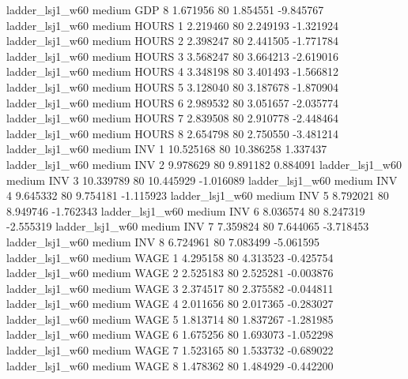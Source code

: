     ladder_lsj1_w60     medium      GDP                 8  1.671956 80       1.854551          -9.845767
    ladder_lsj1_w60     medium    HOURS                 1  2.219460 80       2.249193          -1.321924
    ladder_lsj1_w60     medium    HOURS                 2  2.398247 80       2.441505          -1.771784
    ladder_lsj1_w60     medium    HOURS                 3  3.568247 80       3.664213          -2.619016
    ladder_lsj1_w60     medium    HOURS                 4  3.348198 80       3.401493          -1.566812
    ladder_lsj1_w60     medium    HOURS                 5  3.128040 80       3.187678          -1.870904
    ladder_lsj1_w60     medium    HOURS                 6  2.989532 80       3.051657          -2.035774
    ladder_lsj1_w60     medium    HOURS                 7  2.839508 80       2.910778          -2.448464
    ladder_lsj1_w60     medium    HOURS                 8  2.654798 80       2.750550          -3.481214
    ladder_lsj1_w60     medium      INV                 1 10.525168 80      10.386258           1.337437
    ladder_lsj1_w60     medium      INV                 2  9.978629 80       9.891182           0.884091
    ladder_lsj1_w60     medium      INV                 3 10.339789 80      10.445929          -1.016089
    ladder_lsj1_w60     medium      INV                 4  9.645332 80       9.754181          -1.115923
    ladder_lsj1_w60     medium      INV                 5  8.792021 80       8.949746          -1.762343
    ladder_lsj1_w60     medium      INV                 6  8.036574 80       8.247319          -2.555319
    ladder_lsj1_w60     medium      INV                 7  7.359824 80       7.644065          -3.718453
    ladder_lsj1_w60     medium      INV                 8  6.724961 80       7.083499          -5.061595
    ladder_lsj1_w60     medium     WAGE                 1  4.295158 80       4.313523          -0.425754
    ladder_lsj1_w60     medium     WAGE                 2  2.525183 80       2.525281          -0.003876
    ladder_lsj1_w60     medium     WAGE                 3  2.374517 80       2.375582          -0.044811
    ladder_lsj1_w60     medium     WAGE                 4  2.011656 80       2.017365          -0.283027
    ladder_lsj1_w60     medium     WAGE                 5  1.813714 80       1.837267          -1.281985
    ladder_lsj1_w60     medium     WAGE                 6  1.675256 80       1.693073          -1.052298
    ladder_lsj1_w60     medium     WAGE                 7  1.523165 80       1.533732          -0.689022
    ladder_lsj1_w60     medium     WAGE                 8  1.478362 80       1.484929          -0.442200

